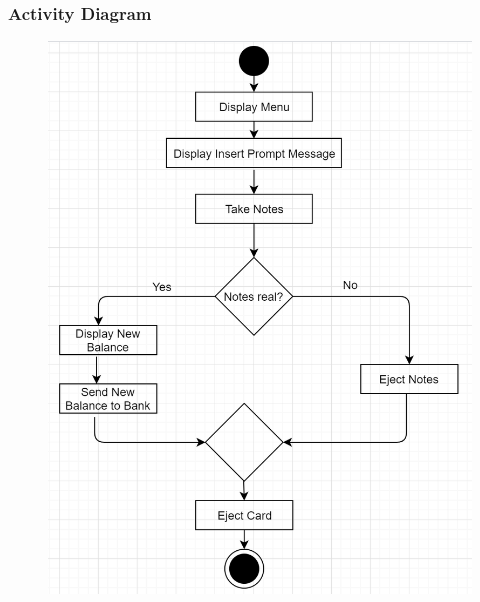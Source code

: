 \documentclass{article}
\begin{document}
		\newpage\subsubsection{Activity Diagram}
		\begin{figure}[h!]
			\begin{center}
				\includegraphics[height=\linewidth]{img/deposit_activity.png}
			\end{center}
		\end{figure}
\end{document}
